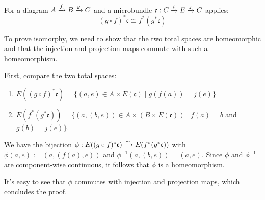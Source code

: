 
\begin{mylemma}\label{induced::composition}
    For a diagram $A \xto{f} B \xto{g} C$ and a microbundle $\mathfrak{c}: \bundle{C}{E}{i}{j}$ applies:
    \[ (g \circ f)^*\mathfrak{c} \cong f^*(g^*\mathfrak{c}) \]
\end{mylemma}
\begin{myproof}
    To prove isomorphy, we need to show that the two total spaces are homeomorphic and that the injection and projection maps commute with
    such a homeomorphism.
    
    First, compare the two total spaces:
    \begin{enumerate}
        \item $E((g \circ f)^*\mathfrak{c}) = \{ (a, e) \in A \times E(\mathfrak{c}) \mid g(f(a)) = j(e)\}$ 
        \item $E(f^*(g^*\mathfrak{c})) = \{ (a, (b, e)) \in A \times (B \times E(\mathfrak{c})) \mid f(a) = b$ and $ g(b) = j(e) \}$.
    \end{enumerate}
    We have the bijection $\phi: E((g \circ f)^*\mathfrak{c}) \isomto E(f^*(g^*\mathfrak{c}))$ with $\phi(a, e) := (a, (f(a), e))$ and $\phi^{-1}(a, (b, e)) = (a, e)$.
    Since $\phi$ and $\phi^{-1}$ are component-wise continuous, it follows that $\phi$ is a homeomorphism.
    
    It's easy to see that $\phi$ commutes with injection and projection maps, which concludes the proof.
\end{myproof}